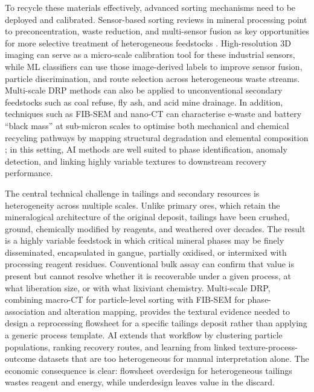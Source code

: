 \documentclass[12pt,a4paper]{article}
\begin{document}
To recycle these materials effectively, advanced sorting mechanisms need to be deployed and calibrated. Sensor-based sorting reviews in mineral processing point to preconcentration, waste reduction, and multi-sensor fusion as key opportunities for more selective treatment of heterogeneous feedstocks \cite{peukert_sorting_2022}. High-resolution 3D imaging can serve as a micro-scale calibration tool for these industrial sensors, while ML classifiers can use those image-derived labels to improve sensor fusion, particle discrimination, and route selection across heterogeneous waste streams. Multi-scale DRP methods can also be applied to unconventional secondary feedstocks such as coal refuse, fly ash, and acid mine drainage. In addition, techniques such as FIB-SEM and nano-CT can characterise e-waste and battery ``black mass'' at sub-micron scales to optimise both mechanical and chemical recycling pathways by mapping structural degradation and elemental composition \cite{battery_blackmass_2021}; in this setting, AI methods are well suited to phase identification, anomaly detection, and linking highly variable textures to downstream recovery performance.

The central technical challenge in tailings and secondary resources is heterogeneity across multiple scales. Unlike primary ores, which retain the mineralogical architecture of the original deposit, tailings have been crushed, ground, chemically modified by reagents, and weathered over decades. The result is a highly variable feedstock in which critical mineral phases may be finely disseminated, encapsulated in gangue, partially oxidised, or intermixed with processing reagent residues. Conventional bulk assay can confirm that value is present but cannot resolve whether it is recoverable under a given process, at what liberation size, or with what lixiviant chemistry. Multi-scale DRP, combining macro-CT for particle-level sorting with FIB-SEM for phase-association and alteration mapping, provides the textural evidence needed to design a reprocessing flowsheet for a specific tailings deposit rather than applying a generic process template. AI extends that workflow by clustering particle populations, ranking recovery routes, and learning from linked texture-process-outcome datasets that are too heterogeneous for manual interpretation alone. The economic consequence is clear: flowsheet overdesign for heterogeneous tailings wastes reagent and energy, while underdesign leaves value in the discard.
\end{document}
